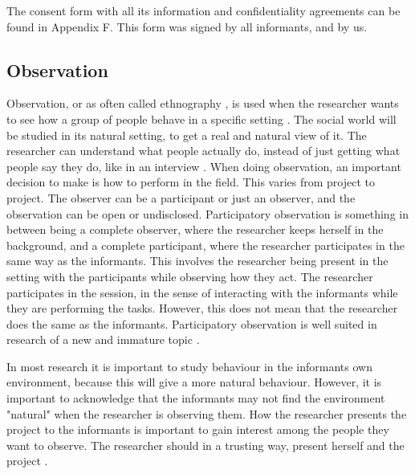 The consent form with all its information and confidentiality agreements can be found in Appendix F. This form was signed by all informants, and by us. 

\subsection{Observation}
\label{subsec:observation}
Observation, or as often called ethnography \cite{tjora}, is used when the researcher wants to see how a group of people behave in a specific setting \cite{qualitative}. The social world will be studied in its natural setting, to get a real and natural view of it. The researcher can understand what people actually do, instead of just getting what people say they do, like in an interview \cite{tjora}. When doing observation, an important decision to make is how to perform in the field. This varies from project to project. The observer can be a participant or just an observer, and the observation can be open or undisclosed. Participatory observation is something in between being a complete observer, where the researcher keeps herself in the background, and a complete participant, where the researcher participates in the same way as the informants. This involves the researcher being present in the setting with the participants while observing how they act. The researcher participates in the session, in the sense of interacting with the informants while they are performing the tasks. However, this does not mean that the researcher does the same as the informants. Participatory observation is well suited in research of a new and immature topic \cite{qualitative}.

In most research it is important to study behaviour in the informants own environment, because this will give a more natural behaviour. However, it is important to acknowledge that the informants may not find the environment "natural" when the researcher is observing them. How the researcher presents the project to the informants is important to gain interest among the people they want to observe. The researcher should in a trusting way, present herself and the project \cite{qualitative}.


